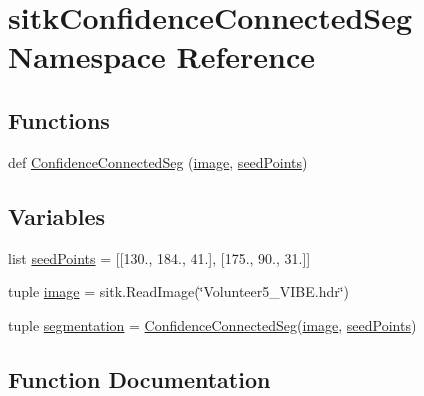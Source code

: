 \hypertarget{namespacesitk_confidence_connected_seg}{}\section{sitk\+Confidence\+Connected\+Seg Namespace Reference}
\label{namespacesitk_confidence_connected_seg}
\subsection*{Functions}
\begin{DoxyCompactItemize}
\item 
def \hyperlink{namespacesitk_confidence_connected_seg_a2be9c5dbc3333db5599c114cae705c89}{Confidence\+Connected\+Seg} (\hyperlink{namespacesitk_confidence_connected_seg_a5013a1ebbf30c96593dd52fe7462750e}{image}, \hyperlink{namespacesitk_confidence_connected_seg_a242f623d43cf8ed6d566b976f4c8ffa4}{seed\+Points})
\end{DoxyCompactItemize}
\subsection*{Variables}
\begin{DoxyCompactItemize}
\item 
list \hyperlink{namespacesitk_confidence_connected_seg_a242f623d43cf8ed6d566b976f4c8ffa4}{seed\+Points} = \mbox{[}\mbox{[}130., 184., 41.\mbox{]}, \mbox{[}175., 90., 31.\mbox{]}\mbox{]}
\item 
tuple \hyperlink{namespacesitk_confidence_connected_seg_a5013a1ebbf30c96593dd52fe7462750e}{image} = sitk.\+Read\+Image(\char`\"{}Volunteer5\+\_\+\+V\+I\+B\+E.\+hdr\char`\"{})
\item 
tuple \hyperlink{namespacesitk_confidence_connected_seg_afc7f0ef969d8d2076c6e7dff1194d1f9}{segmentation} = \hyperlink{namespacesitk_confidence_connected_seg_a2be9c5dbc3333db5599c114cae705c89}{Confidence\+Connected\+Seg}(\hyperlink{namespacesitk_confidence_connected_seg_a5013a1ebbf30c96593dd52fe7462750e}{image}, \hyperlink{namespacesitk_confidence_connected_seg_a242f623d43cf8ed6d566b976f4c8ffa4}{seed\+Points})
\end{DoxyCompactItemize}


\subsection{Function Documentation}
\hypertarget{namespacesitk_confidence_connected_seg_a2be9c5dbc3333db5599c114cae705c89}{}
